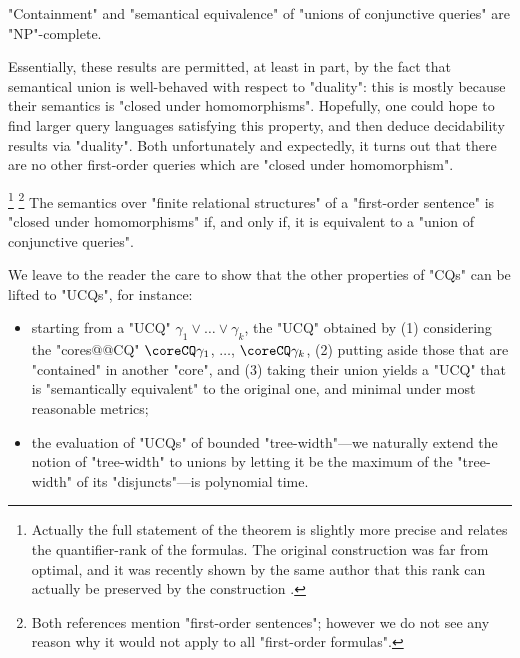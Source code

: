\begin{corollary}
	"Containment" and "semantical equivalence" of "unions of conjunctive queries"
	are "NP"-complete.
\end{corollary}

Essentially, these results are permitted, at least in part, by the fact that semantical union
is well-behaved with respect to "duality": this is mostly because their semantics 
is "closed under homomorphisms". Hopefully, one could hope to find larger
query languages satisfying this property, and then deduce decidability results via "duality".
Both unfortunately and expectedly, it turns out that there
are no other first-order queries which are "closed under homomorphism".\AP
\begin{proposition}
	\!\footnote{Actually the full statement of the theorem is
	slightly more precise and relates the quantifier-rank of the formulas.
	The original construction was far from optimal, and it was
	recently shown by the same author
	that this rank can actually be preserved by the construction
	\cite[Theorem~1.4]{Rossman2025Equirank}.}%
	\footnote{Both references mention "first-order sentences"; however we do not see
	any reason why it would not apply to all "first-order formulas".}
	The semantics over "finite relational structures"
	of a "first-order sentence" is "closed under homomorphisms"
	if, and only if, it is equivalent to a "union of conjunctive queries".
\end{proposition}

We leave to the reader the care to show that the other properties of "CQs"
can be lifted to "UCQs", for instance:
\begin{itemize}
	\item starting from a "UCQ" $\gamma_1 \lor \dotsc \lor \gamma_k$,
		the "UCQ" obtained by (1) considering the "cores@@CQ"
		$\coreCQ\gamma_1$, $\dotsc$, $\coreCQ\gamma_k$,
		(2) putting aside those that are "contained" in another "core",
		and (3) taking their union
		yields a "UCQ" that is "semantically equivalent" to the
		original one, and minimal under most reasonable metrics;
	\item the evaluation of "UCQs" of bounded "tree-width"---we naturally
		extend the notion of "tree-width" to unions by letting it
		be the maximum of the "tree-width" of its "disjuncts"---is
		polynomial time. 
\end{itemize}